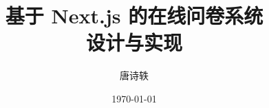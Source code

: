 \documentclass[12pt,a4paper,fontset=windows]{ctexart}
\title{\textbf{基于 Next.js 的在线问卷系统\\设计与实现}}
\author{唐诗轶}
\date{\today}
\begin{document}




\tableofcontents
\newpage

\onehalfspacing  %


\newpage

\newpage

\newpage

\newpage

\newpage






\appendix
\newpage

\end{document}
